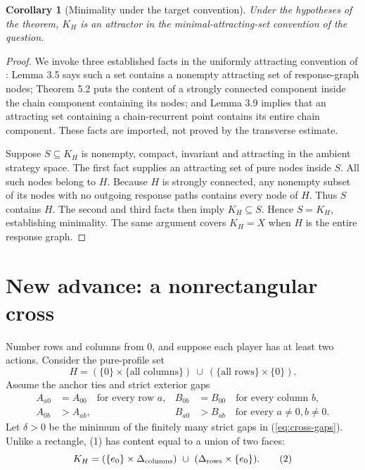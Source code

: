 \documentclass[11pt]{article}
\newtheorem{corollary}{Corollary}
\theoremstyle{definition}
\theoremstyle{remark}
\begin{document}
\begin{corollary}[Minimality under the target convention]
Under the hypotheses of the theorem, $K_H$ is an attractor in the minimal-attracting-set convention of the question.
\end{corollary}
\begin{proof}
We invoke three established facts in the uniformly attracting convention of
\cite{chain}: Lemma 3.5 says such a set contains a nonempty attracting set
of response-graph nodes; Theorem 5.2 puts the content of a strongly connected
component inside the chain component containing its nodes; and Lemma 3.9
implies that an attracting set containing a chain-recurrent point contains
its entire chain component. These facts are imported, not proved by the
transverse estimate.

Suppose $S\subseteq K_H$ is nonempty, compact, invariant and attracting in
the ambient strategy space. The first fact supplies an attracting set of
pure nodes inside $S$. All such nodes belong to $H$. Because $H$ is strongly
connected, any nonempty subset of its nodes with no outgoing response paths
contains every node of $H$. Thus $S$ contains $H$. The second and third
facts then imply $K_H\subseteq S$. Hence $S=K_H$, establishing minimality.
The same argument covers $K_H=X$ when $H$ is the entire response graph.
\end{proof}


\section{New advance: a nonrectangular cross}
Number rows and columns from $0$, and suppose each player has at least two
actions. Consider the pure-profile set
\[
 H=(\{0\}\times\{\text{all columns}\})
       \ \cup\ (\{\text{all rows}\}\times\{0\}).       \tag{1}
\]
Assume the anchor ties and strict exterior gaps
\begin{align}
 A_{a0}&=A_{00}\quad\text{for every row }a,
 &B_{0b}&=B_{00}\quad\text{for every column }b,\label{eq:cross-ties}\\
 A_{0b}&>A_{ab},&B_{a0}&>B_{ab}
       \quad\text{for every }a\neq0, b\neq0.\label{eq:cross-gaps}
\end{align}
Let $\delta>0$ be the minimum of the finitely many strict gaps in
(\ref{eq:cross-gaps}). Unlike a rectangle, (1) has content equal to a union
of two faces:
\[
 K_H=(\{e_0\}\times\Delta_{\rm columns})
        \ \cup\ (\Delta_{\rm rows}\times\{e_0\}).       \tag{2}
\]
\end{document}
